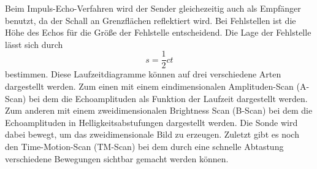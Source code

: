 Beim Impuls-Echo-Verfahren wird der Sender gleichezeitig auch als Empfänger benutzt,
da der Schall an Grenzflächen reflektiert wird. Bei Fehlstellen ist die Höhe des
Echos für die Größe der Fehlstelle entscheidend. Die Lage der Fehlstelle lässt sich
durch
\begin{equation}
  s = \frac{1}{2} c t
\end{equation}
bestimmen. Diese Laufzeitdiagramme können auf drei verschiedene Arten dargestellt werden.
Zum einen mit einem eindimensionalen Amplituden-Scan (A-Scan) bei dem die Echoamplituden als Funktion
der Laufzeit dargestellt werden. Zum anderen mit einem zweidimensionalen Brightness
Scan (B-Scan) bei dem die Echoamplituden in Helligkeitsabstufungen dargestellt werden.
Die Sonde wird dabei bewegt, um das zweidimensionale Bild zu erzeugen.
Zuletzt gibt es noch den Time-Motion-Scan (TM-Scan) bei dem durch eine schnelle Abtastung
verschiedene Bewegungen sichtbar gemacht werden können.
